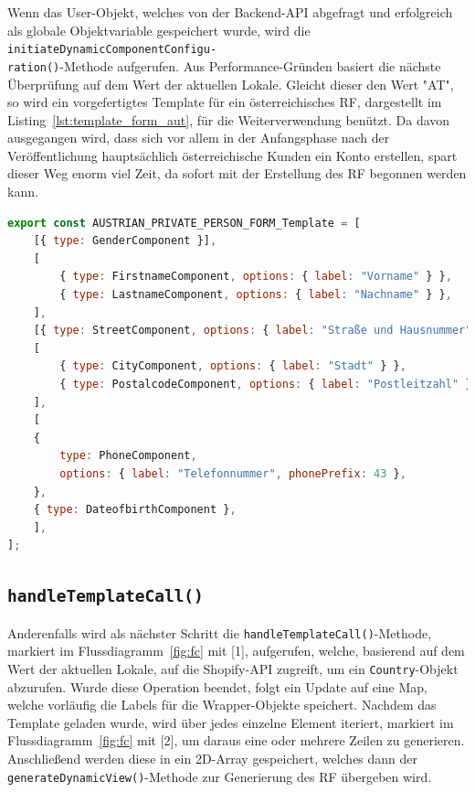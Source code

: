 Wenn das User-Objekt, welches von der Backend-API abgefragt und erfolgreich als globale Objektvariable gespeichert wurde, wird die \texttt{initiateDynamicComponentConfigu-\\ration()}-Methode aufgerufen. Aus Performance-Gründen basiert die nächste Überprüfung auf dem Wert der aktuellen Lokale. Gleicht dieser den Wert "AT", so wird ein vorgefertigtes Template für ein österreichisches RF, dargestellt im Listing~\ref{lst:template_form_aut}, für die Weiterverwendung benützt. Da davon ausgegangen wird, dass sich vor allem in der Anfangsphase nach der Veröffentlichung hauptsächlich österreichische Kunden ein Konto erstellen, spart dieser Weg enorm viel Zeit, da sofort mit der Erstellung des RF begonnen werden kann.

\begin{lstlisting}[caption={Vordefiniertes Template für das RF}, language=JavaScript,label={lst:template_form_aut}]
export const AUSTRIAN_PRIVATE_PERSON_FORM_Template = [
	[{ type: GenderComponent }],
	[
		{ type: FirstnameComponent, options: { label: "Vorname" } },
		{ type: LastnameComponent, options: { label: "Nachname" } },
	],
	[{ type: StreetComponent, options: { label: "Straße und Hausnummer" } }],
	[
		{ type: CityComponent, options: { label: "Stadt" } },
		{ type: PostalcodeComponent, options: { label: "Postleitzahl" } },
	],
	[
	{
		type: PhoneComponent,
		options: { label: "Telefonnummer", phonePrefix: 43 },
	},
	{ type: DateofbirthComponent },
	],
];
\end{lstlisting}

\subsection{\texttt{handleTemplateCall()}}

Anderenfalls wird als nächster Schritt die \texttt{handleTemplateCall()}-Methode, markiert im Flussdiagramm~\ref{fig:fc} mit [1], aufgerufen, welche, basierend auf dem Wert der aktuellen Lokale, auf die Shopify-API zugreift, um ein \texttt{Country}-Objekt abzurufen. Wurde diese Operation beendet, folgt ein Update auf eine Map, welche vorläufig die Labels für die Wrapper-Objekte speichert. Nachdem das Template geladen wurde, wird über jedes einzelne Element iteriert, markiert im Flussdiagramm~\ref{fig:fc} mit [2], um daraus eine oder mehrere Zeilen zu generieren. Anschließend werden diese in ein 2D-Array gespeichert, welches dann der \texttt{generateDynamicView()}-Methode zur Generierung des RF übergeben wird.

